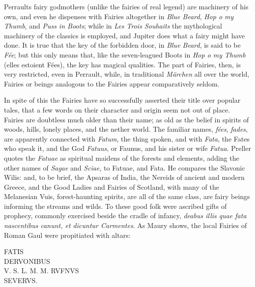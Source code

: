 \documentclass[14pt,a4paper]{memoir}
\begin{document}
{Perrault\textquotesingle s fairy godmothers (unlike the fairies of real
legend) are machinery of his own, and even he dispenses with Fairies
altogether in \emph{Blue Beard}, \emph{Hop o\textquotesingle{} my
Thumb}, and \emph{Puss in Boots}; while in \emph{Les Trois Souhaits} the
mythological machinery of the classics is employed, and Jupiter does
what a fairy might have done. It is true that the key of the forbidden
door, in \emph{Blue Beard}, is said to be \emph{Fée}; but this only
means that, like the seven-leagued Boots in \emph{Hop
o\textquotesingle{} my Thumb} (\textquotesingle elles estoient
Fées\textquotesingle), the key has magical qualities. The part of
Fairies, then, is very restricted, even in Perrault, while, in
traditional \emph{Märchen} all over the world, Fairies or beings
analogous to the Fairies appear comparatively seldom.

In spite of this the Fairies have so successfully asserted their title
over popular tales, that a few words on their character and origin seem
not out of place. Fairies are doubtless much older than their name; as
old as the belief in spirits of woods, hills, lonely places, and the
nether world. The familiar names, \emph{fées}, \emph{fades}, are
apparently connected with \emph{Fatum}, the thing spoken, and with
\emph{Fata}, the Fates who speak it, and the God \emph{Fatuus}, or
Faunus, and his sister or wife
\emph{Fatua}.
Preller quotes the \emph{Fatuae} as spiritual maidens of the forests and
elements, adding the other names of \emph{Sagae} and \emph{Sciae}, to
Fatuae, and
Fata.
He compares the Slavonic Wilis: and, to be brief, the Apsaras of India,
the Nereids of ancient and modern Greece, and the Good Ladies and
Fairies of Scotland, with many of the Melanesian Vuis, forest-haunting
spirits, are all of the same class, are fairy beings informing the
streams and wilds. To these good folk were ascribed gifts of prophecy,
commonly exercised beside the cradle of infancy, \emph{deabus illis quae
fata nascentibus canunt, et dicuntur
Carmentes}.
As Maury
shows,
the local Fairies of Roman Gaul were propitiated with altars:

FATIS\\
DERVONIBUS\\
V. S. L. M. M. RVFNVS\\
SEVERVS.

}
\end{document}
